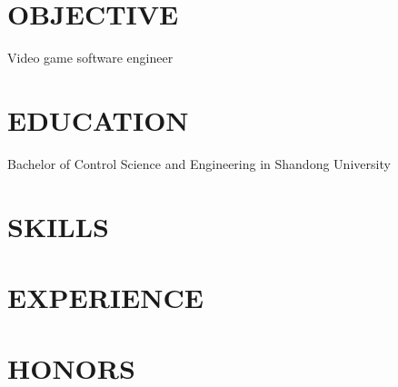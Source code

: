 \documentclass[line,margin]{res}
\begin{document}

\address{+86 18665801973}
\address{wanghaoyu00x@gmail.com}

\begin{resume}

\section{OBJECTIVE}
Video game software engineer

\section{EDUCATION}

Bachelor of Control Science and Engineering in Shandong University \\

\section{SKILLS}

\section{EXPERIENCE}

\section{HONORS}

\end{resume}
\end{document}
